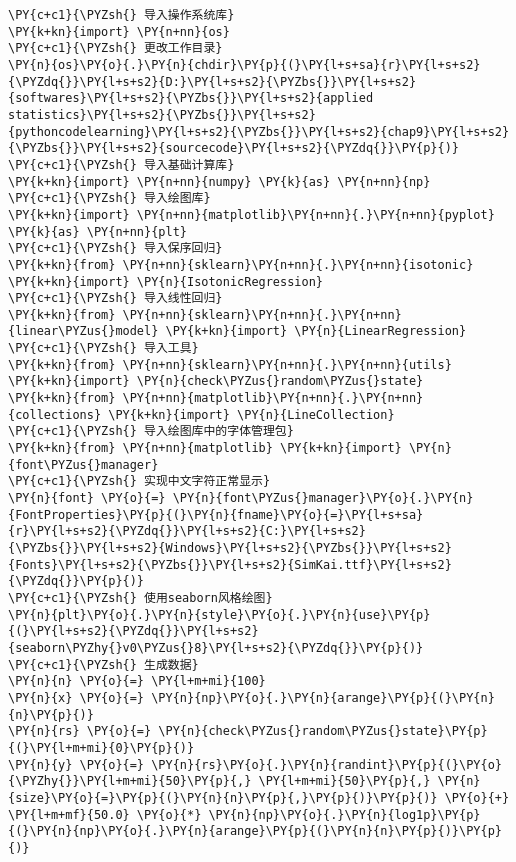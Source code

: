 \begin{Verbatim}[commandchars=\\\{\}]
\PY{c+c1}{\PYZsh{} 导入操作系统库}
\PY{k+kn}{import} \PY{n+nn}{os}
\PY{c+c1}{\PYZsh{} 更改工作目录}
\PY{n}{os}\PY{o}{.}\PY{n}{chdir}\PY{p}{(}\PY{l+s+sa}{r}\PY{l+s+s2}{\PYZdq{}}\PY{l+s+s2}{D:}\PY{l+s+s2}{\PYZbs{}}\PY{l+s+s2}{softwares}\PY{l+s+s2}{\PYZbs{}}\PY{l+s+s2}{applied statistics}\PY{l+s+s2}{\PYZbs{}}\PY{l+s+s2}{pythoncodelearning}\PY{l+s+s2}{\PYZbs{}}\PY{l+s+s2}{chap9}\PY{l+s+s2}{\PYZbs{}}\PY{l+s+s2}{sourcecode}\PY{l+s+s2}{\PYZdq{}}\PY{p}{)}
\PY{c+c1}{\PYZsh{} 导入基础计算库}
\PY{k+kn}{import} \PY{n+nn}{numpy} \PY{k}{as} \PY{n+nn}{np}
\PY{c+c1}{\PYZsh{} 导入绘图库}
\PY{k+kn}{import} \PY{n+nn}{matplotlib}\PY{n+nn}{.}\PY{n+nn}{pyplot} \PY{k}{as} \PY{n+nn}{plt}
\PY{c+c1}{\PYZsh{} 导入保序回归}
\PY{k+kn}{from} \PY{n+nn}{sklearn}\PY{n+nn}{.}\PY{n+nn}{isotonic} \PY{k+kn}{import} \PY{n}{IsotonicRegression}
\PY{c+c1}{\PYZsh{} 导入线性回归}
\PY{k+kn}{from} \PY{n+nn}{sklearn}\PY{n+nn}{.}\PY{n+nn}{linear\PYZus{}model} \PY{k+kn}{import} \PY{n}{LinearRegression}
\PY{c+c1}{\PYZsh{} 导入工具}
\PY{k+kn}{from} \PY{n+nn}{sklearn}\PY{n+nn}{.}\PY{n+nn}{utils} \PY{k+kn}{import} \PY{n}{check\PYZus{}random\PYZus{}state}
\PY{k+kn}{from} \PY{n+nn}{matplotlib}\PY{n+nn}{.}\PY{n+nn}{collections} \PY{k+kn}{import} \PY{n}{LineCollection}
\PY{c+c1}{\PYZsh{} 导入绘图库中的字体管理包}
\PY{k+kn}{from} \PY{n+nn}{matplotlib} \PY{k+kn}{import} \PY{n}{font\PYZus{}manager}
\PY{c+c1}{\PYZsh{} 实现中文字符正常显示}
\PY{n}{font} \PY{o}{=} \PY{n}{font\PYZus{}manager}\PY{o}{.}\PY{n}{FontProperties}\PY{p}{(}\PY{n}{fname}\PY{o}{=}\PY{l+s+sa}{r}\PY{l+s+s2}{\PYZdq{}}\PY{l+s+s2}{C:}\PY{l+s+s2}{\PYZbs{}}\PY{l+s+s2}{Windows}\PY{l+s+s2}{\PYZbs{}}\PY{l+s+s2}{Fonts}\PY{l+s+s2}{\PYZbs{}}\PY{l+s+s2}{SimKai.ttf}\PY{l+s+s2}{\PYZdq{}}\PY{p}{)}
\PY{c+c1}{\PYZsh{} 使用seaborn风格绘图}
\PY{n}{plt}\PY{o}{.}\PY{n}{style}\PY{o}{.}\PY{n}{use}\PY{p}{(}\PY{l+s+s2}{\PYZdq{}}\PY{l+s+s2}{seaborn\PYZhy{}v0\PYZus{}8}\PY{l+s+s2}{\PYZdq{}}\PY{p}{)}
\PY{c+c1}{\PYZsh{} 生成数据}
\PY{n}{n} \PY{o}{=} \PY{l+m+mi}{100}
\PY{n}{x} \PY{o}{=} \PY{n}{np}\PY{o}{.}\PY{n}{arange}\PY{p}{(}\PY{n}{n}\PY{p}{)}
\PY{n}{rs} \PY{o}{=} \PY{n}{check\PYZus{}random\PYZus{}state}\PY{p}{(}\PY{l+m+mi}{0}\PY{p}{)}
\PY{n}{y} \PY{o}{=} \PY{n}{rs}\PY{o}{.}\PY{n}{randint}\PY{p}{(}\PY{o}{\PYZhy{}}\PY{l+m+mi}{50}\PY{p}{,} \PY{l+m+mi}{50}\PY{p}{,} \PY{n}{size}\PY{o}{=}\PY{p}{(}\PY{n}{n}\PY{p}{,}\PY{p}{)}\PY{p}{)} \PY{o}{+} \PY{l+m+mf}{50.0} \PY{o}{*} \PY{n}{np}\PY{o}{.}\PY{n}{log1p}\PY{p}{(}\PY{n}{np}\PY{o}{.}\PY{n}{arange}\PY{p}{(}\PY{n}{n}\PY{p}{)}\PY{p}{)}

\end{Verbatim}
